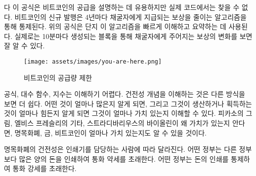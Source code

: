 \begin{comment}	
	While this formula is useful to describe Bitcoin's supply, it is actually
	nowhere to be found in the code. Issuance of new bitcoin is done in an
	algorithmically controlled fashion, by reducing the reward which is paid to
	miners every four years~\cite{btcwiki:supply}. The formula above is used to
	quickly sum up what is happening under the hood. What really happens can be best
	seen by looking at the change in block reward, the reward paid out to whoever
	finds a valid block, which roughly happens every 10 minutes.
\end{comment}다
이 공식은 비트코인의 공급을 설명하는 데 유용하지만 실제 코드에서는 찾을 수 없다. 
비트코인의 신규 발행은  4년마다 채굴자에게 지급되는 보상을 줄이는 알고리즘을 통해 통제된다\cite{btcwiki:supply}.
위의 공식은 단지 이 알고리즘을 빠르게 이해하고 요약하는 데 사용된다. 
실제로는 10분마다 생성되는 블록을 통해 채굴자에게 주어지는 보상의 변화를 보면 잘 알 수 있다.

\begin{figure}
	\texttt{[image: assets/images/you-are-here.png]}
	\caption{비트코인의 공급량 제한}
	\label{fig:you-are-here.png}
\end{figure}

\begin{comment}	
	Formulas, logarithmic functions and exponentials are not exactly
	intuitive to understand. The concept of \textit{soundness} might be easier to
	understand if looked at in another way. Once we know how much there is
	of something, and once we know how hard this something is to produce or
	get our hands on, we immediately understand its value. What is true for
	Picasso's paintings, Elvis Presley's guitars, and Stradivarius violins
	is also true for fiat currency, gold, and bitcoins.
\end{comment}
공식, 대수 함수, 지수는 이해하기 어렵다. 
건전성 개념을 이해하는 것은 다른 방식을 보면 더 쉽다.
어떤 것이 얼마나 많은지 알게 되면, 그리고 그것이 생산하거나 획득하는 것이 얼마나 힘든지 알게 되면 
그것이 얼마나 가치 있는지 이해할 수 있다. 
피카소의 그림, 엘비스 프레슬리의 기타, 스트라디바리우스의 바이올린이 왜 가치가 있는지 안다면,
명목화폐, 금, 비트코인이 얼마나 가치 있는지도 알 수 있을 것이다.

\begin{comment}	
	The hardness of fiat currency depends on who is in charge of the
	respective printing presses. Some governments might be more willing to
	print large amounts of currency than others, resulting in a weaker
	currency. Other governments might be more restrictive in their money
	printing, resulting in harder currency.
\end{comment}
명목화폐의 건전성은 인쇄기를 담당하는 사람에 따라 달라진다. 
어떤 정부는 다른 정부보다 많은 양의 돈을 인쇄하여 통화 약세를 초래한다. 
어떤 정부는 돈의 인쇄를 통제하여 통화 강세를 초래한다.


